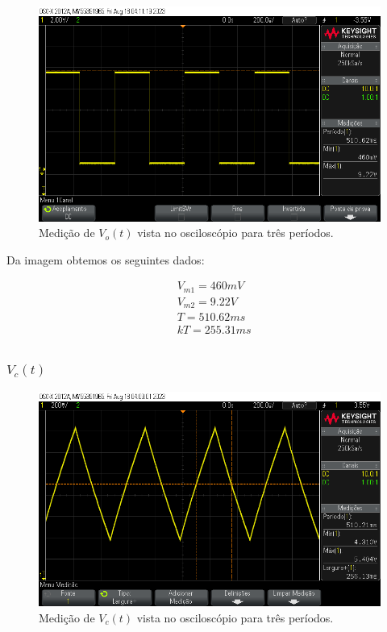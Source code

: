 \begin{figure}[h]
    \label{fig:ex2}
    \centering
    \includegraphics[width=0.7\columnwidth]{images/ex1_vo.png}
    \caption{Medição de $V_o(t)$ vista no osciloscópio para três períodos.}
\end{figure}

Da imagem obtemos os seguintes dados:

\begin{equation}
    \begin{aligned}
         & V_{m1} = 460mV \\
         & V_{m2} = 9.22V \\
         & T = 510.62ms   \\
         & kT =  255.31ms \\
    \end{aligned}
\end{equation}


\subsubsection{$V_c (t)$}

\begin{figure}[h]
    \centering
    \includegraphics[width=0.7\columnwidth]{images/ex1_vc0.png}
    \caption{Medição de $V_c(t)$ vista no osciloscópio para três períodos.}
\end{figure}

